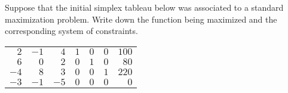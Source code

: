 \documentclass[11pt,letterpaper]{article}
\begin{document}
 Suppose that the initial simplex tableau below was associated to a standard maximization problem. Write down the function being maximized and the corresponding system of constraints. \par
	\begin{table}[!ht]
	\centering
	\begin{tabular}{rrrrrr|r}
	$2$ & $-1$ & $4$ & $1$ & $0$ & $0$ & $100$ \\
	$6$ & $0$ & $2$ & $0$ & $1$ & $0$ & $80$ \\
	$-4$ & $8$ & $3$ & $0$ & $0$ & $1$ & $220$ \\ \hline
	$-3$ & $-1$ & $-5$ & $0$ & $0$ & $0$ & $0$ \\
	\end{tabular}
	\end{table} \pspace
\end{document}

